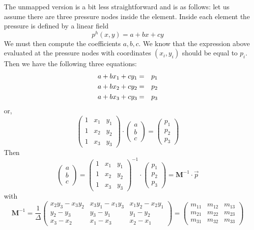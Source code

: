 The unmapped version is a bit less straightforward and is as follows:
let us assume there are three pressure nodes inside the element.
Inside each element the pressure is defined by a linear field
\[
p^h(x,y) = a+bx+cy
\]
We must then compute the coefficients $a,b,c$. We know that 
the expression above evaluated at the pressure nodes with 
coordinates $(x_i,y_i)$ should be equal to $p_i$. 
Then we have the following three equations:
\begin{eqnarray}
a + bx_1 + cy_1 &=& p_1 \nonumber\\
a + bx_2 + cy_2 &=& p_2 \nonumber\\
a + bx_3 + cy_3 &=& p_3 \nonumber
\end{eqnarray}
or, 
\[
\left(
\begin{array}{ccc}
1 & x_1 & y_1 \\
1 & x_2 & y_2 \\
1 & x_3 & y_3 
\end{array}
\right)
\cdot 
\left(
\begin{array}{ccc}
a \\ b \\ c
\end{array}
\right)
=
\left(
\begin{array}{ccc}
p_1 \\ p_2 \\ p_3
\end{array}
\right)
\]
Then 
\[
\left(
\begin{array}{ccc}
a \\ b \\ c
\end{array}
\right)
=
\left(
\begin{array}{ccc}
1 & x_1 & y_1 \\
1 & x_2 & y_2 \\
1 & x_3 & y_3 
\end{array}
\right)^{-1}
\cdot
\left(
\begin{array}{ccc}
p_1 \\ p_2 \\ p_3
\end{array}
\right)
= {\bm M}^{-1} \cdot \vec{p}
\]
with 
\[
{\bm M}^{-1} = \frac{1}{\Delta}
\left(
\begin{array}{ccc}
x_2y_3-x_3y_2 & x_3y_1-x_1y_3 & x_1y_2-x_2y_1 \\
y_2-y_3 & y_3-y_1 & y_1-y_2 \\
x_3-x_2 & x_1-x_3 & x_2-x_1
\end{array}
\right)
=
\left(
\begin{array}{ccc}
m_{11} & m_{12} & m_{13} \\
m_{21} & m_{22} & m_{23} \\
m_{31} & m_{32} & m_{33} 
\end{array}
\right)
\]
